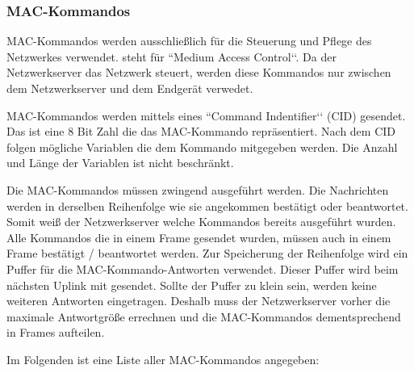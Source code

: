 \documentclass[a4paper, 12pt]{article}
\begin{document}
            \subsubsection{MAC-Kommandos}
                MAC-Kommandos werden ausschließlich für die Steuerung und Pflege des Netzwerkes verwendet. steht 
                für ``Medium Access Control‘‘. Da der Netzwerkserver das Netzwerk steuert, werden diese Kommandos nur 
                zwischen dem Netzwerkserver und dem Endgerät verwedet.

                MAC-Kommandos werden mittels eines ``Command Indentifier‘‘ (CID) gesendet. Das ist eine 8 Bit Zahl die 
                das MAC-Kommando repräsentiert. Nach dem CID folgen mögliche Variablen die dem Kommando mitgegeben 
                werden. Die Anzahl und Länge der Variablen ist nicht beschränkt.
                
                Die MAC-Kommandos müssen zwingend ausgeführt werden. Die Nachrichten werden in derselben Reihenfolge 
                wie sie angekommen bestätigt oder beantwortet. Somit weiß der Netzwerkserver welche Kommandos 
                bereits ausgeführt wurden. Alle Kommandos die in einem Frame gesendet wurden, müssen auch in einem Frame  
                bestätigt / beantwortet werden. Zur Speicherung der Reihenfolge wird ein Puffer für die 
                MAC-Kommando-Antworten verwendet. Dieser Puffer wird beim nächsten Uplink mit gesendet. 
                Sollte der Puffer zu klein sein, werden keine weiteren Antworten eingetragen. 
                Deshalb muss der Netzwerkserver vorher die maximale Antwortgröße errechnen und die 
                MAC-Kommandos dementsprechend in Frames aufteilen.\cite[S.29 ff.]{LoRaSpec}

                Im Folgenden ist eine Liste aller MAC-Kommandos angegeben:
           
\end{document}
